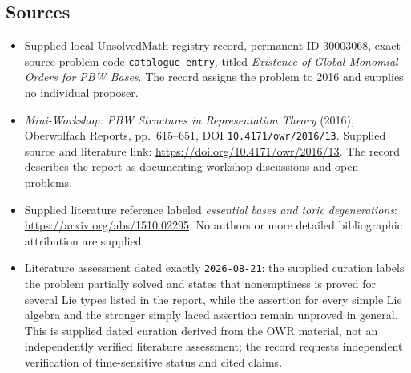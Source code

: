 \documentclass[11pt]{article}
\begin{document}
\subsection{Sources}
\begin{itemize}
\item Supplied local UnsolvedMath registry record, permanent ID \(30003068\), exact source problem code \texttt{catalogue entry}, titled \emph{Existence of Global Monomial Orders for PBW Bases}. The record assigns the problem to 2016 and supplies no individual proposer.
\item \emph{Mini-Workshop: PBW Structures in Representation Theory} (2016), Oberwolfach Reports, pp.~615--651, DOI \texttt{10.4171/owr/2016/13}. Supplied source and literature link: \url{https://doi.org/10.4171/owr/2016/13}. The record describes the report as documenting workshop discussions and open problems.
\item Supplied literature reference labeled \emph{essential bases and toric degenerations}: \url{https://arxiv.org/abs/1510.02295}. No authors or more detailed bibliographic attribution are supplied.
\item Literature assessment dated exactly \texttt{2026-08-21}: the supplied curation labels the problem partially solved and states that nonemptiness is proved for several Lie types listed in the report, while the assertion for every simple Lie algebra and the stronger simply laced assertion remain unproved in general. This is supplied dated curation derived from the OWR material, not an independently verified literature assessment; the record requests independent verification of time-sensitive status and cited claims.
\end{itemize}
\end{document}
